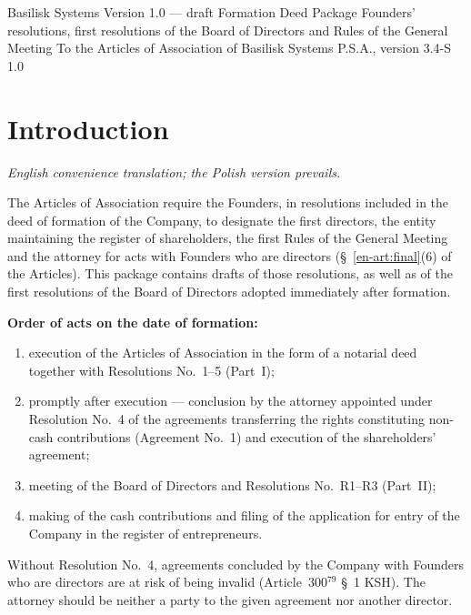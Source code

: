 \documentclass[11pt,a4paper]{report}
\newcommand{\US}[1]{\S~#1 of the Articles}
\begin{document}

\BusinessPlanTitlePage
  {Basilisk Systems}
  {Version 1.0 --- draft}
  {Formation Deed Package}
  {Founders' resolutions, first resolutions of the Board of Directors and Rules of the General Meeting}
  {To the Articles of Association of Basilisk Systems P.S.A., version 3.4-S}
  {1.0}

\tableofcontents
\newpage

\chapter*{Introduction}

{\small\itshape English convenience translation; the Polish version prevails.\par}

The Articles of Association require the Founders, in resolutions included in the deed of formation of the Company, to designate the first directors, the entity maintaining the register of shareholders, the first Rules of the General Meeting and the attorney for acts with Founders who are directors (\US{\ref{en-art:final}(6)}). This package contains drafts of those resolutions, as well as of the first resolutions of the Board of Directors adopted immediately after formation.

\textbf{Order of acts on the date of formation:}
\begin{enumerate}
  \item execution of the Articles of Association in the form of a notarial deed together with Resolutions No.~1--5 (Part~I);
  \item promptly after execution --- conclusion by the attorney appointed under Resolution No.~4 of the agreements transferring the rights constituting non-cash contributions (Agreement No.~1) and execution of the shareholders' agreement;
  \item meeting of the Board of Directors and Resolutions No.~R1--R3 (Part~II);
  \item making of the cash contributions and filing of the application for entry of the Company in the register of entrepreneurs.
\end{enumerate}

Without Resolution No.~4, agreements concluded by the Company with Founders who are directors are at risk of being invalid (Article~300$^{79}$ \S~1 KSH). The attorney should be neither a party to the given agreement nor another director.
\end{document}
